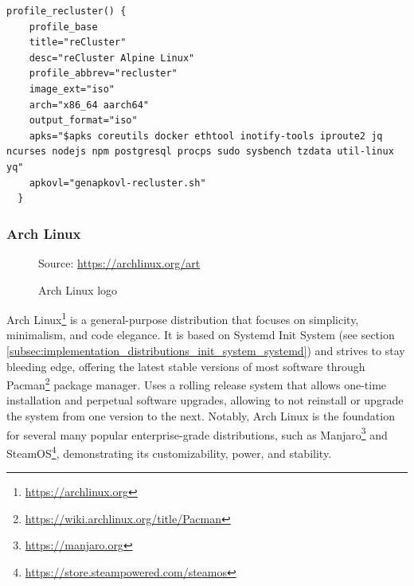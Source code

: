 \begin{lstlisting}[language=shell, morekeywords={[2]{profile_recluster, profile_base}}, morekeywords={[4]{title, desc, profile_abbrev, image_ext, arch, output_format, apks, apkovl}}, xleftmargin=\parindent, label={lst:alpine}, caption=Contents of \texttt{mkimg.recluster.sh} file which shows the reCluster profile definition]
  profile_recluster() {
    profile_base
    title="reCluster"
    desc="reCluster Alpine Linux"
    profile_abbrev="recluster"
    image_ext="iso"
    arch="x86_64 aarch64"
    output_format="iso"
    apks="$apks coreutils docker ethtool inotify-tools iproute2 jq ncurses nodejs npm postgresql procps sudo sysbench tzdata util-linux yq"
    apkovl="genapkovl-recluster.sh"
  }
\end{lstlisting}

\subsubsection{Arch Linux}
\label{subsubsec:implementation_distributions_iso_arch_linux}

\begin{figure} %
  \centering
  \def\stackalignment{r} %
  {\scriptsize \parbox[t]{\linewidth}{ Source: \url{https://archlinux.org/art}} }
  \caption{Arch Linux logo}
\end{figure}

Arch Linux\footnote{\url{https://archlinux.org}} is a general-purpose distribution
that focuses on simplicity, minimalism, and code elegance. It is based on
Systemd Init System (see section \ref{subsec:implementation_distributions_init_system_systemd})
and strives to stay bleeding edge, offering the latest stable versions of most software
through Pacman\footnote{\url{https://wiki.archlinux.org/title/Pacman}} package manager.
Uses a rolling release system that allows one-time installation and perpetual
software upgrades, allowing to not reinstall or upgrade the system from one version
to the next. Notably, Arch Linux is the foundation for several many popular enterprise-grade
distributions, such as Manjaro\footnote{\url{https://manjaro.org}} and SteamOS\footnote{\url{https://store.steampowered.com/steamos}},
demonstrating its customizability, power, and stability\cite{arch_linux}.

